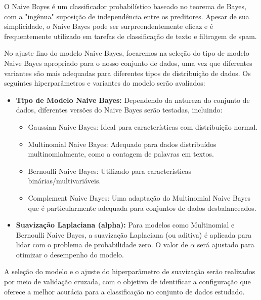 O Naive Bayes é um classificador probabilístico baseado no teorema de Bayes, com a "ingênua" suposição de independência entre os preditores. Apesar de sua simplicidade, o Naive Bayes pode ser surpreendentemente eficaz e é frequentemente utilizado em tarefas de classificação de texto e filtragem de spam.

No ajuste fino do modelo Naive Bayes, focaremos na seleção do tipo de modelo Naive Bayes apropriado para o nosso conjunto de dados, uma vez que diferentes variantes são mais adequadas para diferentes tipos de distribuição de dados. Os seguintes hiperparâmetros e variantes do modelo serão avaliados:

\begin{itemize}
    \item \textbf{Tipo de Modelo Naive Bayes:} Dependendo da natureza do conjunto de dados, diferentes versões do Naive Bayes serão testadas, incluindo:
    \begin{itemize}
        \item Gaussian Naive Bayes: Ideal para características com distribuição normal.
        \item Multinomial Naive Bayes: Adequado para dados distribuídos multinomialmente, como a contagem de palavras em textos.
        \item Bernoulli Naive Bayes: Utilizado para características binárias/multivariáveis.
        \item Complement Naive Bayes: Uma adaptação do Multinomial Naive Bayes que é particularmente adequada para conjuntos de dados desbalanceados.
    \end{itemize}
    \item \textbf{Suavização Laplaciana (alpha):} Para modelos como Multinomial e Bernoulli Naive Bayes, a suavização Laplaciana (ou aditiva) é aplicada para lidar com o problema de probabilidade zero. O valor de $\alpha$ será ajustado para otimizar o desempenho do modelo.
\end{itemize}

A seleção do modelo e o ajuste do hiperparâmetro de suavização serão realizados por meio de validação cruzada, com o objetivo de identificar a configuração que oferece a melhor acurácia para a classificação no conjunto de dados estudado.


